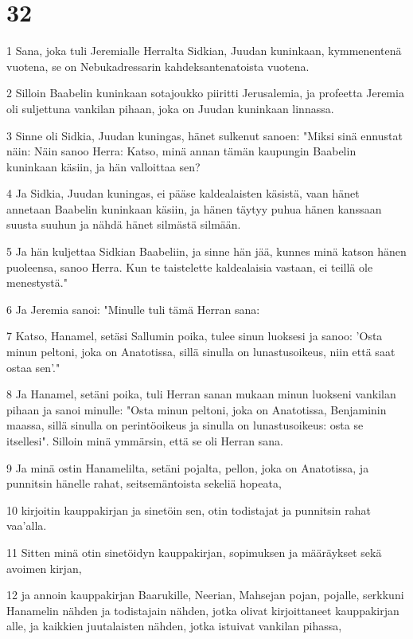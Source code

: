 \chapter{32}

\par 1 Sana, joka tuli Jeremialle Herralta Sidkian, Juudan kuninkaan, kymmenentenä vuotena, se on Nebukadressarin kahdeksantenatoista vuotena.
\par 2 Silloin Baabelin kuninkaan sotajoukko piiritti Jerusalemia, ja profeetta Jeremia oli suljettuna vankilan pihaan, joka on Juudan kuninkaan linnassa.
\par 3 Sinne oli Sidkia, Juudan kuningas, hänet sulkenut sanoen: "Miksi sinä ennustat näin: Näin sanoo Herra: Katso, minä annan tämän kaupungin Baabelin kuninkaan käsiin, ja hän valloittaa sen?
\par 4 Ja Sidkia, Juudan kuningas, ei pääse kaldealaisten käsistä, vaan hänet annetaan Baabelin kuninkaan käsiin, ja hänen täytyy puhua hänen kanssaan suusta suuhun ja nähdä hänet silmästä silmään.
\par 5 Ja hän kuljettaa Sidkian Baabeliin, ja sinne hän jää, kunnes minä katson hänen puoleensa, sanoo Herra. Kun te taistelette kaldealaisia vastaan, ei teillä ole menestystä."
\par 6 Ja Jeremia sanoi: "Minulle tuli tämä Herran sana:
\par 7 Katso, Hanamel, setäsi Sallumin poika, tulee sinun luoksesi ja sanoo: 'Osta minun peltoni, joka on Anatotissa, sillä sinulla on lunastusoikeus, niin että saat ostaa sen'."
\par 8 Ja Hanamel, setäni poika, tuli Herran sanan mukaan minun luokseni vankilan pihaan ja sanoi minulle: "Osta minun peltoni, joka on Anatotissa, Benjaminin maassa, sillä sinulla on perintöoikeus ja sinulla on lunastusoikeus: osta se itsellesi". Silloin minä ymmärsin, että se oli Herran sana.
\par 9 Ja minä ostin Hanamelilta, setäni pojalta, pellon, joka on Anatotissa, ja punnitsin hänelle rahat, seitsemäntoista sekeliä hopeata,
\par 10 kirjoitin kauppakirjan ja sinetöin sen, otin todistajat ja punnitsin rahat vaa'alla.
\par 11 Sitten minä otin sinetöidyn kauppakirjan, sopimuksen ja määräykset sekä avoimen kirjan,
\par 12 ja annoin kauppakirjan Baarukille, Neerian, Mahsejan pojan, pojalle, serkkuni Hanamelin nähden ja todistajain nähden, jotka olivat kirjoittaneet kauppakirjan alle, ja kaikkien juutalaisten nähden, jotka istuivat vankilan pihassa,
